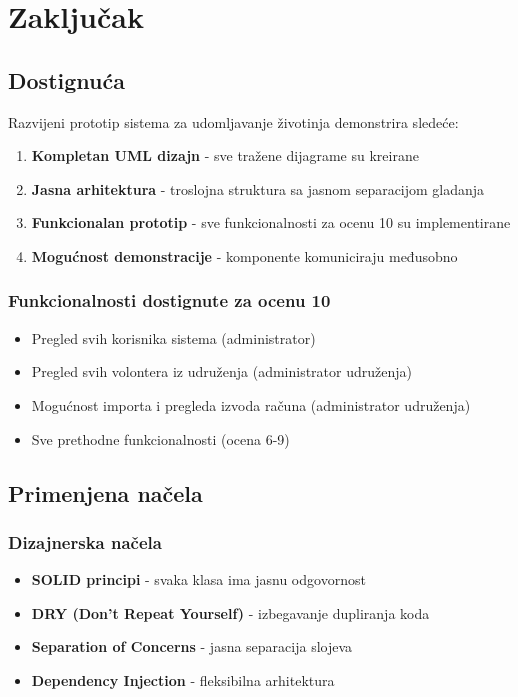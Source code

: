 \chapter{Zaključak}

\section{Dostignuća}

Razvijeni prototip sistema za udomljavanje životinja demonstrira sledeće:

\begin{enumerate}
    \item \textbf{Kompletan UML dizajn} - sve tražene dijagrame su kreirane
    \item \textbf{Jasna arhitektura} - troslojna struktura sa jasnom separacijom gladanja
    \item \textbf{Funkcionalan prototip} - sve funkcionalnosti za ocenu 10 su implementirane
    \item \textbf{Mogućnost demonstracije} - komponente komuniciraju međusobno
\end{enumerate}

\subsection{Funkcionalnosti dostignute za ocenu 10}

\begin{itemize}
    \item \checkmark Pregled svih korisnika sistema (administrator)
    \item \checkmark Pregled svih volontera iz udruženja (administrator udruženja)
    \item \checkmark Mogućnost importa i pregleda izvoda računa (administrator udruženja)
    \item \checkmark Sve prethodne funkcionalnosti (ocena 6-9)
\end{itemize}

\section{Primenjena načela}

\subsection{Dizajnerska načela}

\begin{itemize}
    \item \textbf{SOLID principi} - svaka klasa ima jasnu odgovornost
    \item \textbf{DRY (Don't Repeat Yourself)} - izbegavanje dupliranja koda
    \item \textbf{Separation of Concerns} - jasna separacija slojeva
    \item \textbf{Dependency Injection} - fleksibilna arhitektura
\end{itemize}

